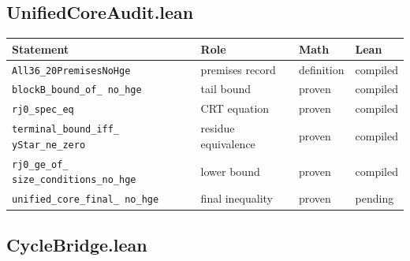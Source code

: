 \subsection{UnifiedCoreAudit.lean}

\begin{center}
\small
\begin{tabular}{@{}p{}p{}p{}p{}@{}}
\toprule
Statement & Role & Math & Lean \\
\midrule
\texttt{All36\_\allowbreak 20PremisesNoHge} & premises record &
  definition & compiled \\
\texttt{blockB\_\allowbreak bound\_\allowbreak of\_\allowbreak
no\_\allowbreak hge} & tail bound & proven & compiled \\
\texttt{rj0\_\allowbreak spec\_\allowbreak eq} & CRT equation &
  proven & compiled \\
\texttt{terminal\_\allowbreak bound\_\allowbreak iff\_\allowbreak
yStar\_\allowbreak ne\_\allowbreak zero} & residue equivalence &
  proven & compiled \\
\texttt{rj0\_\allowbreak ge\_\allowbreak of\_\allowbreak
size\_\allowbreak conditions\_\allowbreak no\_\allowbreak hge} &
  lower bound & proven & compiled \\
\texttt{unified\_\allowbreak core\_\allowbreak final\_\allowbreak
no\_\allowbreak hge} & final inequality & proven & pending \\
\bottomrule
\end{tabular}
\end{center}

\subsection{CycleBridge.lean}

